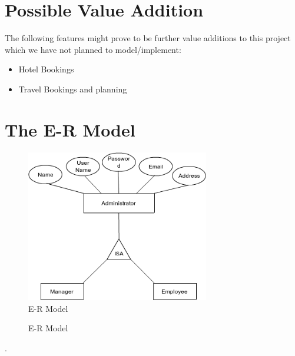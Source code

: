 \documentclass[a4paper,11pt]{article}
\begin{document}
\section{Possible Value Addition}
The following features might prove to be further value additions to this project which we have not planned to model/implement:
\begin{itemize}
\item Hotel Bookings
\item Travel Bookings and planning
\end{itemize}

\section{The E-R Model}
\begin{figure}[ht!]
\centering
\includegraphics[width=80mm]{admin.png}
\caption{E-R Model}
\label{overflow}
\end{figure}

\begin{figure}[ht!]
\centering
{}
\caption{E-R Model}
\label{overflow}
\end{figure}
.
\newline
\newline
\newline
\newline
\end{document}
